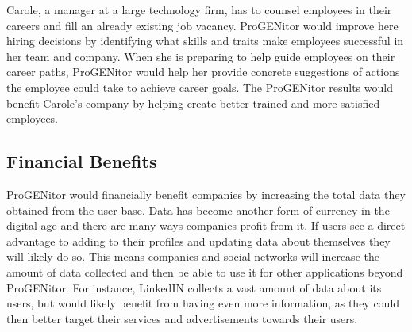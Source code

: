 Carole, a manager at a large technology firm, has to counsel employees in their
careers and fill an already existing job vacancy.  ProGENitor would
improve here hiring decisions by identifying what skills and traits make
employees successful in her team and company.  When she is preparing to help
guide employees  on their career paths, ProGENitor would help her provide
concrete suggestions of actions the employee could take to achieve career goals.
The ProGENitor results  would benefit Carole's company by helping create better
trained and more satisfied employees.

\subsection{Financial Benefits}
ProGENitor would financially benefit companies by increasing the total data
they obtained from the user base.  Data has become another form of currency in
the digital age and there are many ways companies profit from it.  If users see
a direct advantage to adding to their profiles and updating data about
themselves they will likely do so.  This means companies and social networks
will increase the amount of data collected and then be able to use it for other
applications beyond ProGENitor.  For instance, LinkedIN collects a vast amount
of data about its users, but would likely benefit from having even more
information, as they could then better target their services and advertisements
towards their users.
